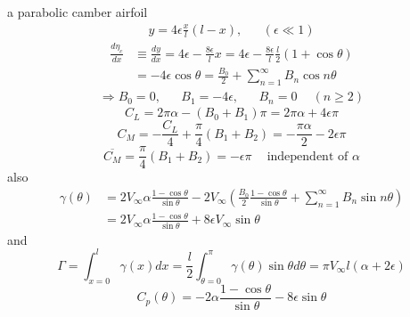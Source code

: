 \begin{example}{a parabolic camber airfoil}
\begin{align*}
y = 4\epsilon\frac{x}{l}\left(l-x\right), &&(\epsilon\ll 1)
\end{align*}
\begin{align*}
\frac{d\eta_c}{dx}
&\equiv \frac{dy}{dx} = 4\epsilon - \frac{8\epsilon}{l}x = 4\epsilon - \frac{8\epsilon}{l}\frac{l}{2}\left(1+\cos\theta\right) \\
&=-4\epsilon\cos\theta = \frac{B_0}{2} + \sum_{n=1}^\infty B_n\cos n\theta
\end{align*}
\begin{align*}
\Longrightarrow B_0=0, && B_1 = -4\epsilon,&& B_n = 0\phantom{-}(n\geq 2)
\end{align*}
\[
C_L = 2\pi\alpha-\left(B_0+B_1\right)\pi = 2\pi\alpha + 4\epsilon\pi
\]
\[
C_M = -\frac{C_L}{4} + \frac{\pi}{4}\left(B_1+B_2\right) = -\frac{\pi\alpha}{2}-2\epsilon\pi
\]
\[
\overline{C_M} = \frac{\pi}{4}\left(B_1+B_2\right) = -\epsilon\pi\phantom{-}\text{independent of }\alpha
\]
also
\begin{align*}
\gamma(\theta)
&= 2V_\infty\alpha\frac{1-\cos\theta}{\sin\theta} - 2V_\infty\left(\frac{B_0}{2}\frac{1-\cos\theta}{\sin\theta} + \sum_{n=1}^\infty B_n\sin n\theta\right) \\
&= 2V_\infty\alpha\frac{1-\cos\theta}{\sin\theta} + 8\epsilon V_\infty\sin\theta
\end{align*}
and
\[
\Gamma = \int_{x=0}^l\gamma(x)dx = \frac{l}{2}\int_{\theta=0}^\pi\gamma(\theta)\sin\theta d\theta = \pi V_\infty l\left(\alpha +2\epsilon\right)
\]
\[
C_p(\theta) =  -2\alpha\frac{1-\cos\theta}{\sin\theta} - 8\epsilon\sin\theta
\]
\end{example}